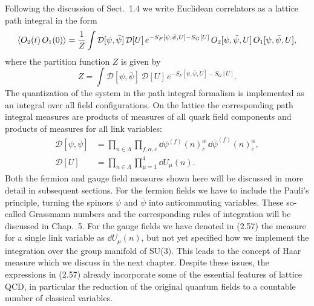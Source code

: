 Following the discussion of Sect.~1.4 we write Euclidean correlators as a
lattice path integral in the form
\begin{equation}
  \left\langle O_2(t)\, O_1(0) \right\rangle = \frac{1}{Z} \int
    \mathcal{D}[\psi, \bar\psi]\, \mathcal{D}[U]\,
    e^{-S_F[\psi,\bar\psi,U] - S_G[U]}\,
    O_2[\psi, \bar\psi, U]\, O_1[\psi, \bar\psi, U] ,
\end{equation}
where the partition function $Z$ is given by
\begin{equation}
  Z = \int \mathcal{D}[\psi, \bar\psi]\, \mathcal{D}[U]\,
    e^{-S_F[\psi,\bar\psi,U] - S_G[U]} .
\end{equation}
The quantization of the system in the path integral formalism is implemented
as an integral over all field configurations. On the lattice the
corresponding path integral measures are products of measures of all quark
field components and products of measures for all link variables:
\begin{equation}
  \begin{split}
    \mathcal{D}[\psi, \bar\psi] &=
      \prod_{n\in\Lambda}\prod_{f,\alpha,c}
      \dd\psi^{(f)}(n)_c^\alpha\,
      \dd\bar\psi^{(f)}(n)_c^\alpha ,\\
    \mathcal{D}[U] &= \prod_{n\in\Lambda}\prod_{\mu=1}^{4} \dd U_\mu(n) .
  \end{split}
\end{equation}
Both the fermion and gauge field measures shown here will be discussed in
more detail in subsequent sections. For the fermion fields we have to
include the Pauli's principle, turning the spinors $\psi$ and $\bar\psi$
into anticommuting variables. These so-called Grassmann numbers and the
corresponding rules of integration will be discussed in Chap.~5. For the
gauge fields we have denoted in (2.57) the measure for a single link
variable as $\dd U_\mu(n)$, but not yet specified how we implement the
integration over the group manifold of SU(3). This leads to the concept of
Haar measure which we discuss in the next chapter. Despite these issues, the
expressions in (2.57) already incorporate some of the essential features of
lattice QCD, in particular the reduction of the original quantum fields to a
countable number of classical variables.

